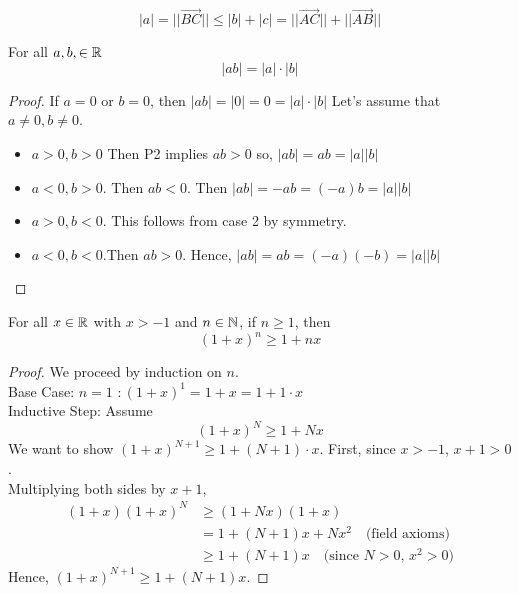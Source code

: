 \documentclass[11pt]{article}
\begin{document}
\begin{center}

\end{center}
\[ |a| = ||\vec{BC}|| \leq |b| + |c| = ||\vec{AC}|| + ||\vec{AB}|| \]
\begin{proposition}
    For all \(a, b, \in \mathbb R\) \[ |ab| = |a|\cdot|b|\]
\end{proposition}
\begin{proof}
    If \(a = 0\) or \(b = 0\), then \(|ab| = |0| = 0 = |a|\cdot|b|\)
    Let's assume that \(a \neq 0, b \neq 0\).
    \begin{itemize}
        \item \(a > 0, b > 0\) Then P2 implies \(ab > 0\) so, \(|ab| = ab = |a||b|\)
        \item \(a < 0, b > 0\). Then \(ab < 0\). Then \(|ab| = -ab = (-a)b = |a||b|\)
        \item \(a > 0, b < 0\). This follows from case 2 by symmetry.
        \item \(a < 0, b < 0\).Then \(ab > 0\). Hence, \(|ab| = ab = (-a)(-b) = |a||b|\)
    \end{itemize}
\end{proof}

\begin{theorem} 
    For all \(x \in \mathbb R\) with \(x > -1\) and \(n \in \mathbb N\), if \(n \geq 1\), then \[(1 + x)^n \geq 1 + nx\]
\end{theorem}
\begin{proof}
    We proceed by induction on \(n\). \\
    Base Case: \(n = 1\) \(\colon (1 + x)^{1} = 1 + x = 1 + 1 \cdot x\)\\
    Inductive Step: Assume
    \[
        (1 + x)^N \geq 1 + Nx
    \]
    We want to show \((1 + x)^{N + 1} \geq 1 + (N + 1) \cdot x\). First, since \(x
    > -1\), \(x + 1 > 0\). \\ Multiplying both sides by \(x + 1\),
    \begin{align*}
        (1 + x)(1 + x)^N & \geq (1 + Nx)(1 + x)                                          \\
                         & = 1 + (N + 1)x + Nx^2 \quad \text{(field axioms)}             \\
                         & \geq 1 + (N + 1)x \quad \text{(since \(N > 0\), \(x^2 > 0\))}
    \end{align*}
    Hence, \((1 + x)^{N + 1} \geq 1 + (N + 1)x\).
\end{proof}
\end{document}
